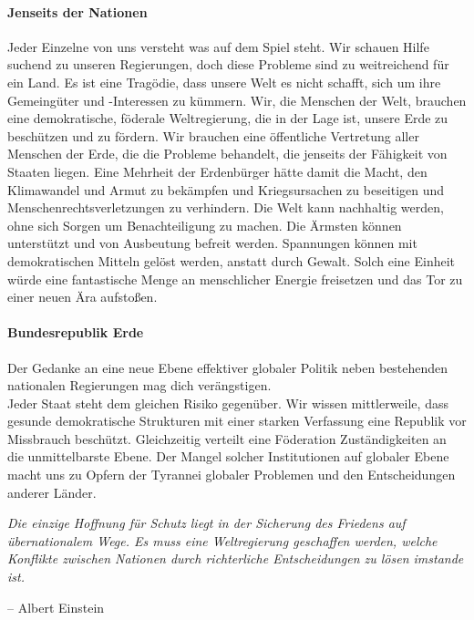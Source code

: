\documentclass[11pt,a4paper]{article}
\begin{document}
\begin{multicols}{2}

\paragraph{Jenseits der Nationen} 

Jeder Einzelne von uns versteht was auf dem Spiel steht.
Wir schauen Hilfe suchend zu unseren Regierungen, doch diese Probleme sind zu weitreichend für ein Land.
Es ist eine Tragödie, dass unsere Welt es nicht schafft, sich um ihre Gemeingüter und -Interessen zu kümmern.
Wir, die Menschen der Welt, brauchen eine demokratische, föderale Weltregierung, die in der Lage ist, unsere Erde zu beschützen und zu fördern.
\noindent Wir brauchen eine öffentliche Vertretung aller Menschen der Erde, die die Probleme behandelt, die jenseits der Fähigkeit von Staaten liegen.
Eine Mehrheit der Erdenbürger hätte damit die Macht, den Klimawandel und Armut zu bekämpfen und Kriegsursachen zu beseitigen und Menschenrechtsverletzungen zu verhindern.
Die Welt kann nachhaltig werden, ohne sich Sorgen um Benachteiligung zu machen.
Die Ärmsten können unterstützt und von Ausbeutung befreit werden.
Spannungen können mit demokratischen Mitteln gelöst werden, anstatt durch Gewalt.
Solch eine Einheit würde eine fantastische Menge an menschlicher Energie freisetzen und das Tor zu einer neuen Ära aufstoßen.

\paragraph{Bundesrepublik Erde}

Der Gedanke an eine neue Ebene effektiver globaler Politik neben bestehenden nationalen Regierungen mag dich verängstigen.\\
\noindent Jeder Staat steht dem gleichen Risiko gegenüber.
Wir wissen mittlerweile, dass gesunde demokratische Strukturen mit einer starken Verfassung eine Republik vor Missbrauch beschützt.
Gleichzeitig verteilt eine Föderation Zuständigkeiten an die unmittelbarste Ebene.
Der Mangel solcher Institutionen auf globaler Ebene macht uns zu Opfern der Tyrannei globaler Problemen und den Entscheidungen anderer Länder.

\vspace{-4pt}
\begin{shaded*}
\noindent \textit{Die einzige Hoffnung für Schutz liegt in der Sicherung des Friedens auf übernationalem Wege. Es muss eine Weltregierung geschaffen werden, welche Konflikte zwischen Nationen durch richterliche Entscheidungen zu lösen imstande ist.}
\begin{flushright}
-- Albert Einstein
\end{flushright}
\vspace{-12pt}
\end{shaded*}
\vspace{-17pt}

\end{multicols}
\end{document}
